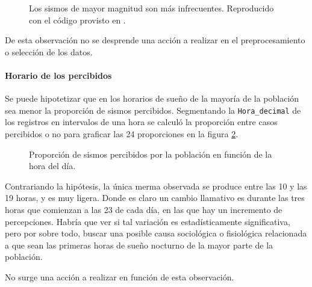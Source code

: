 \documentclass[a4paper]{report}
\begin{document}
\begin{figure}[!ht]
\centering

\caption{Los sismos de mayor magnitud son más infrecuentes. Reproducido con el código provisto en \cite{daniela_parada_sismos-arg_nodate}.}
\label{fig:acumulado_anual_magnitud}
\end{figure}

De esta observación no se desprende una acción a realizar en el preprocesamiento o selección de los datos.


\paragraph{Horario de los percibidos}
Se puede hipotetizar que en los horarios de sueño de la mayoría de la población sea menor la proporción de sismos percibidos.
Segmentando la \verb'Hora_decimal' de los registros en intervalos de una hora se calculó la proporción entre casos percibidos o no para graficar las 24 proporciones en la figura \ref{fig:histograma_percibidos_por_hora}. 
\begin{figure}[!ht]
\centering

\caption{Proporción de sismos percibidos por la población en función de la hora del día.}
\label{fig:histograma_percibidos_por_hora}
\end{figure}

Contrariando la hipótesis, la única merma observada se produce entre las 10 y las 19 horas, y es muy ligera.
Donde es claro un cambio llamativo es durante las tres horas que comienzan a las 23 de cada día, en las que hay un incremento de percepciones. 
Habría que ver si tal variación es estadísticamente significativa, pero por sobre todo, buscar una posible causa sociológica o fisiológica relacionada a que sean las primeras horas de sueño nocturno de la mayor parte de la población.

No surge una acción a realizar en función de esta observación.
\end{document}

